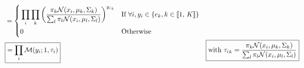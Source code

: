 \documentclass{article}
\begin{document}
\begin{equation*}
\begin{aligned}
                                   & = \vast\{
        \begin{aligned}
             & \prod_i \prod_k \left(\frac{\pi_k\mathcal{N}(x_i, \mu_k, \Sigma_k)}{\sum_l \pi_l \mathcal{N}(x_i, \mu_l, \Sigma_l)}\right)^{{y_i}_k} &  & \text{If } \forall i, y_i \in \set{e_k, k\in\Inter{1}{K}} \\
             & 0                                                                                                                                    &  & \text{Otherwise}                                          \\
        \end{aligned} &                                                                                                                                                                                                                                            \\
                                   & \boxed{= \prod_i \mathcal{M}(y_i; 1, \tau_i)}                                                            & \boxed{\text{with } {\tau_i}_k = \frac{\pi_k\mathcal{N}(x_i, \mu_k, \Sigma_k)}{\sum_l \pi_l \mathcal{N}(x_i, \mu_l, \Sigma_l)}} \\
    \end{aligned}
\end{equation*}
\end{document}
